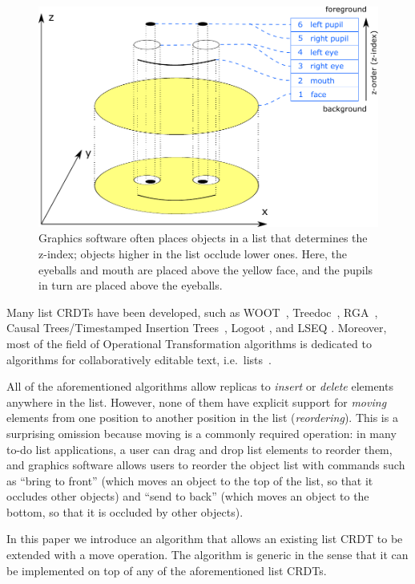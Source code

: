 \documentclass[sigplan,10pt]{acmart}
\begin{document}
\begin{figure}
  \centering
  \includegraphics{smiley.pdf}
  \caption{Graphics software often places objects in a list that determines the z-index; objects higher in the list occlude lower ones. %
    Here, the eyeballs and mouth are placed above the yellow face, and the pupils in turn are placed above the eyeballs.}
  \label{fig:smiley}
\end{figure}

Many list CRDTs have been developed, such as WOOT~\cite{Oster:2006wj}, Treedoc~\cite{Preguica:2009fz}, RGA~\cite{Roh:2011dw}, Causal Trees/Timestamped Insertion Trees~\cite{Grishchenko:2014eh,Attiya:2016kh}, Logoot \cite{Weiss:2009ht,Weiss:2010hx}, and LSEQ \cite{Nedelec:2013ky,Nedelec:2016eo}.
Moreover, most of the field of Operational Transformation algorithms is dedicated to algorithms for collaboratively editable text, i.e.\ lists~\cite{Ellis:1989ue,Nichols:1995fd,Ressel:1996wx,Sun:1998vf,Oster:2006tr}.

All of the aforementioned algorithms allow replicas to \emph{insert} or \emph{delete} elements anywhere in the list.
However, none of them have explicit support for \emph{moving} elements from one position to another position in the list (\emph{reordering}).
This is a surprising omission because moving is a commonly required operation: in many to-do list applications, a user can drag and drop list elements to reorder them, and graphics software allows users to reorder the object list with commands such as ``bring to front'' (which moves an object to the top of the list, so that it occludes other objects) and ``send to back'' (which moves an object to the bottom, so that it is occluded by other objects).

In this paper we introduce an algorithm that allows an existing list CRDT to be extended with a move operation.
The algorithm is generic in the sense that it can be implemented on top of any of the aforementioned list CRDTs.
\end{document}
